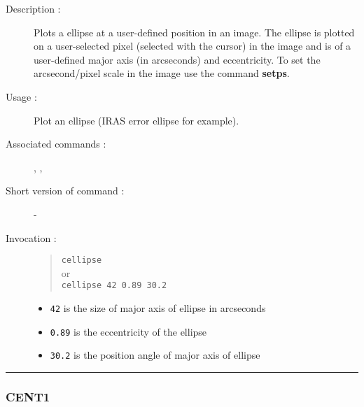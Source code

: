 \begin{description}

\item[Description :] Plots a ellipse at a user-defined position in an
image.  The ellipse is plotted on a user-selected pixel (selected with
the cursor) in the image and is of a user-defined major axis (in
arcseconds) and eccentricity.  To set the arcsecond/pixel scale in the
image use the command {\bf setps}.

\item[Usage :] Plot an ellipse (IRAS error ellipse for example).
\item[Associated commands :] {\tt {}},
{\tt {}}, {\tt {}}
\item[Short version of command :] -
\item[Invocation :]

\begin{quote}{\tt  cellipse }\\
or \\
{\tt cellipse 42 0.89 30.2 }
\end{quote}

\begin{itemize}

\item {\tt 42} is the size of major axis of ellipse in arcseconds
\item {\tt 0.89} is the eccentricity of the ellipse
\item {\tt 30.2} is the position angle of major axis of ellipse

\end{itemize}

\end{description}

\hrule
\subsubsection*{\label{CENT1}CENT1}


